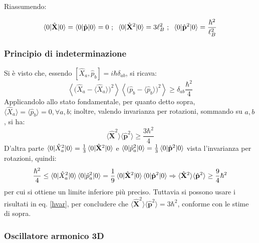 \documentclass[10pt, a4paper]{scrartcl} %
\numberwithin{equation}{subsection}
\theoremstyle{style2}
\theoremstyle{style1}
\newenvironment{boxenv}[1][]{
    \begin{eqbox}[#1]
    }{
   \end{eqbox}
}
\begin{document}
Riassumendo:
\begin{boxenv}[]
	\begin{equation}\label{hvar}
		\braket{0|\hat{\mathbf{X} }|0} = \braket{0|\hat{\mathbf{p} }|0} = 0\ ; \hspace{.2cm}\braket{0|\hat{\mathbf{X} }^2|0} = 3\ell _B^2 \ ; \hspace{.2cm} \braket{0|\hat{\mathbf{p} }^2|0} = \frac{\hbar ^2}{\ell _B^2}
\end{equation}
\end{boxenv}
\subsubsection{Principio di indeterminazione}
Si \`e visto che, essendo $[\hat{X}_a, \hat{p}_b] = i \hbar  \delta _{ab} $, si ricava:
\begin{equation}
	\left\langle \big(\hat{X}_a - \langle \hat{X}_a \rangle\big)^2 \right\rangle \left\langle \big(\hat{p}_b - \langle \hat{p}_b \rangle\big)^2 \right\rangle \ge \delta _{ab} \frac{\hbar ^2}{4}
\end{equation}
Applicandolo allo stato fondamentale, per quanto detto sopra, $\langle \hat{X}_a \rangle= \langle \hat{p}_b \rangle=0, \forall a,b$; inoltre, valendo invarianza per rotazioni, sommando su $a,b$, si ha:
\begin{equation}
	\langle \hat{\mathbf{X} }^2 \rangle \langle \hat{\mathbf{p} }^2 \rangle\ge \frac{3\hbar ^2}{4}
\end{equation}
D'altra parte $\braket{0|\hat{X}_a^2|0} = \frac{1}{3} \braket{0|\hat{\mathbf{X} }^2|0} $ e $\braket{0|\hat{p}_a^2|0} = \frac{1}{3} \braket{0|\hat{\mathbf{p} }^2|0} $ vista l'invarianza per rotazioni, quindi:
\begin{equation}
	\frac{\hbar^2}{4}\le \braket{0|\hat{X}_a^2|0} \braket{0|\hat{p}_a^2|0} = \frac{1}{9} \braket{0|\hat{\mathbf{X} }^2|0}  \braket{0|\hat{\mathbf{p} }^2|0} \Rightarrow \langle \hat{\mathbf{X} }^2 \rangle \langle \hat{\mathbf{p} }^2 \rangle \ge \frac{9}{4}\hbar ^2
\end{equation}
per cui si ottiene un limite inferiore pi\`u preciso. Tuttavia si possono usare i risultati in eq. \ref{hvar}, per concludere che $\langle \hat{\mathbf{X} }^2 \rangle\langle \hat{\mathbf{p} }^2 \rangle = 3\hbar ^2$, conforme con le stime di sopra.

\subsubsection{Oscillatore armonico 3D}
\end{document}
